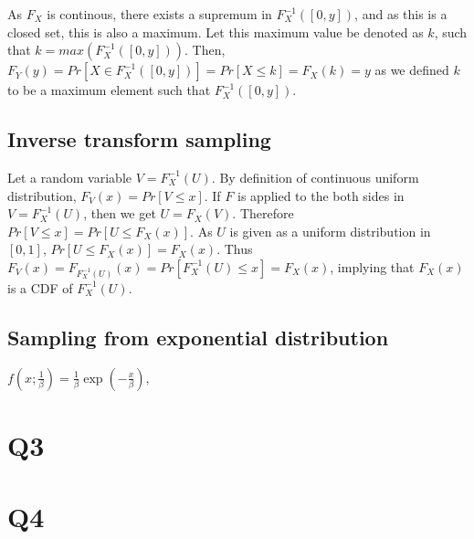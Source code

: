 \documentclass{article}
\begin{document}
As $F_X$ is continous, there exists a supremum in $F_X^{-1}([0, y])$, and as this is a closed set, this is also a maximum. Let this maximum value be denoted as $k$, such that $k = max(F_X^{-1}([0, y]))$.
Then, $F_Y(y) = Pr[X \in F_X^{-1}([0, y])] = Pr[X \leq k] = F_X(k) = y$ as we defined $k$ to be a maximum element such that $F_X^{-1}([0, y])$.

\subsection{Inverse transform sampling}
Let a random variable $V = F_X^{-1}(U)$. By definition of continuous uniform distribution, $F_V(x) = Pr[V \leq x]$. If $F$ is applied to the both sides in $V = F_X^{-1}(U)$, then we get $U = F_X(V)$.
Therefore $Pr[V \leq x] = Pr[U \leq F_X(x)]$. As $U$ is given as a uniform distribution in $[0, 1]$, $Pr[U \leq F_X(x)] = F_X(x)$. Thus $F_V(x) = F_{F_X^{-1}(U)}(x) = Pr[F_X^{-1}(U) \leq x] = F_X(x)$,
implying that $F_X(x)$ is a CDF of $F_X^{-1}(U)$. 

\subsection{Sampling from exponential distribution}
$f(x; \frac{1}{\beta}) = \frac{1}{\beta} \exp(-\frac{x}{\beta}),$

\section{Q3}

\section{Q4}
\end{document}
